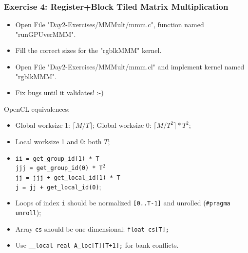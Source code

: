 \documentclass{beamer}
\begin{document}
\begin{frame}[fragile,t]
  \frametitle{Exercise 4: Register+Block Tiled Matrix Multiplication}

\begin{itemize}
    \item Open File "Day2-Exercises/MMMult/mmm.c", function named "runGPUverMMM".
    \item Fill the correct sizes for the "rgblkMMM" kernel.
    \item Open File "Day2-Exercises/MMMult/mmm.cl" and implement kernel named "rgblkMMM".
    \item Fix bugs until it validates! :-)
\end{itemize}

OpenCL equivalences: \pause
\begin{itemize}
    \item Global worksize 1: $\lceil M/T \rceil$; Global worksize 0: $\lceil M/T^2 \rceil * T^2$;
    \item Local worksize 1 and 0: both $T$;
    \item {\tt ii = get\_group\_id(1) * T}\\
          {\tt jjj = get\_group\_id(0) * T$^2$}\\
          {\tt jj = jjj + get\_local\_id(1) * T}\\
          {\tt j = jj + get\_local\_id(0)};
    \item Loops of index {\tt i} should be normalized {\tt[0..T-1]} and unrolled ({\tt \#pragma unroll});
    \item Array {\tt cs} should be one dimensional: {\tt float cs[T];}
    \item Use {\tt \_\_local real A\_loc[T][T+1];} for bank conflicts.
\end{itemize}

\end{frame}
\end{document}

